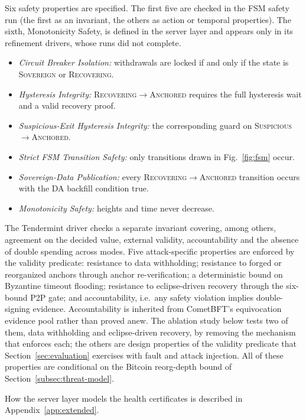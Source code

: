 Six safety properties are specified. The first five are checked in the FSM safety
run (the first as an invariant, the others as action or temporal properties). The
sixth, Monotonicity Safety, is defined in the server layer and appears only in its
refinement drivers, whose runs did not complete.
\begin{itemize}
  \item \emph{Circuit Breaker Isolation:} withdrawals are locked if and only
  if the state is \textsc{Sovereign} or \textsc{Recovering}.
  \item \emph{Hysteresis Integrity:} \textsc{Recovering}$\to$\textsc{Anchored}
  requires the full hysteresis wait and a valid recovery proof.
  \item \emph{Suspicious-Exit Hysteresis Integrity:} the corresponding guard
  on \textsc{Suspicious}$\to$\textsc{Anchored}.
  \item \emph{Strict FSM Transition Safety:} only transitions drawn in
  Fig.~\ref{fig:fsm} occur.
  \item \emph{Sovereign-Data Publication:} every
  \textsc{Recovering}$\to$\textsc{Anchored} transition occurs with the DA
  backfill condition true.
  \item \emph{Monotonicity Safety:} heights and time never decrease.
\end{itemize}
The Tendermint driver checks a separate invariant covering, among others, agreement on the decided value, external validity, accountability and the absence of double spending across modes.
Five attack-specific properties are enforced by the validity predicate:
resistance to data withholding; resistance to forged or reorganized anchors
through anchor re-verification; a deterministic bound on Byzantine
timeout flooding; resistance to eclipse-driven recovery through the
six-bound P2P gate; and accountability, i.e.\ any safety violation implies
double-signing evidence. Accountability is inherited from CometBFT's
equivocation evidence pool rather than proved anew. The ablation study below tests two of them,
data withholding and eclipse-driven recovery, by removing the mechanism that
enforces each; the others are design properties of the validity predicate that
Section~\ref{sec:evaluation} exercises with fault and attack injection. All of
these properties are conditional on the Bitcoin reorg-depth bound of
Section~\ref{subsec:threat-model}.

How the server layer models the health certificates is described in Appendix~\ref{app:extended}.

